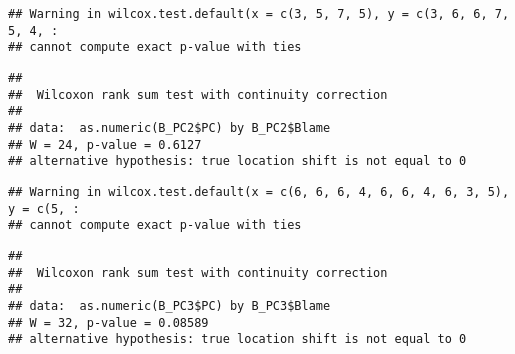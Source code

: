 \documentclass[
]{article}
\newenvironment{Shaded}{\begin{snugshade}}{\end{snugshade}}
\newcommand{\CommentTok}[1]{\textcolor[rgb]{0.56,0.35,0.01}{\textit{#1}}}
\newcommand{\DecValTok}[1]{\textcolor[rgb]{0.00,0.00,0.81}{#1}}
\newcommand{\KeywordTok}[1]{\textcolor[rgb]{0.13,0.29,0.53}{\textbf{#1}}}
\newcommand{\NormalTok}[1]{#1}
\newcommand{\OperatorTok}[1]{\textcolor[rgb]{0.81,0.36,0.00}{\textbf{#1}}}
\newcommand{\StringTok}[1]{\textcolor[rgb]{0.31,0.60,0.02}{#1}}
\begin{document}
\begin{verbatim}
## Warning in wilcox.test.default(x = c(3, 5, 7, 5), y = c(3, 6, 6, 7, 5, 4, :
## cannot compute exact p-value with ties
\end{verbatim}

\begin{verbatim}
## 
##  Wilcoxon rank sum test with continuity correction
## 
## data:  as.numeric(B_PC2$PC) by B_PC2$Blame
## W = 24, p-value = 0.6127
## alternative hypothesis: true location shift is not equal to 0
\end{verbatim}

\begin{Shaded}
\end{Shaded}

\begin{verbatim}
## Warning in wilcox.test.default(x = c(6, 6, 6, 4, 6, 6, 4, 6, 3, 5), y = c(5, :
## cannot compute exact p-value with ties
\end{verbatim}

\begin{verbatim}
## 
##  Wilcoxon rank sum test with continuity correction
## 
## data:  as.numeric(B_PC3$PC) by B_PC3$Blame
## W = 32, p-value = 0.08589
## alternative hypothesis: true location shift is not equal to 0
\end{verbatim}

\begin{Shaded}
\end{Shaded}
\end{document}
